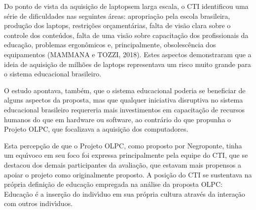 \documentclass[
12pt,		%
openright,	%
twoside,  %
a4paper,			%
chapter=TITLE,		%
english,			%
french,				%
spanish,			%
brazil				%
]{USPSC-classe/USPSC}
\begin{document}
Do ponto de vista da aquisi\c{c}\~ao de \textquotedbl laptops\textquotedbl  em larga escala, o CTI identificou uma s\'erie de dificuldades nas seguintes \'areas: apropria\c{c}\~ao pela escola brasileira, produ\c{c}\~ao dos laptops, restri\c{c}\~oes or\c{c}ament\'arias, falta de vis\~ao clara sobre o controle dos conte\'udos, falta de uma vis\~ao sobre capacita\c{c}\~ao dos profissionais da educa\c{c}\~ao, problemas ergon\^omicos e, principalmente, obsolesc\^encia dos equipamentos  (MAMMANA e TOZZI, 2018). Estes aspectos demonstraram que a ideia de aquisi\c{c}\~ao de milh\~oes de laptops representava um risco muito grande para o sistema educacional brasileiro.

















O estudo apontava, tamb\'em, que o sistema educacional poderia se beneficiar de alguns aspectos da proposta, mas que qualquer iniciativa disruptiva no sistema educacional brasileiro requereria mais investimentos em capacita\c{c}\~ao de recursos humanos do que em hardware ou software, ao contr\'ario do que propunha o Projeto OLPC, que focalizava a aquisi\c{c}\~ao dos computadores.

















Esta percep\c{c}\~ao de que o Projeto OLPC, como proposto por Negroponte, tinha um equ\'{\i}voco em seu foco foi expressa principalmente pela equipe do CTI, que se destacou dos demais participantes da avalia\c{c}\~ao, que estavam mais propensos a apoiar o projeto como originalmente proposto. A posi\c{c}\~ao do CTI se sustentava na pr\'opria defini\c{c}\~ao de educa\c{c}\~ao empregada na an\'alise da proposta OLPC: \textquotedbl Educa\c{c}\~ao \'e a inser\c{c}\~ao do indiv\'{\i}duo em sua pr\'opria cultura atrav\'es da intera\c{c}\~ao com outros indiv\'{\i}duos\textquotedbl .
\end{document}
